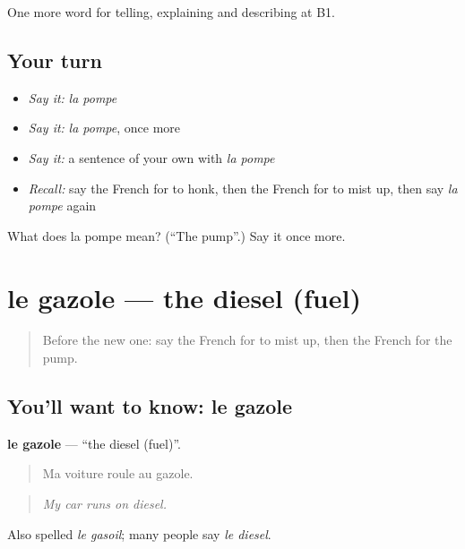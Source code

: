 \begin{grammarlens}[title={What you've built}]
One more word for telling, explaining and describing at B1.
\end{grammarlens}

\subsection*{Your turn}
\begin{itemize}
\raggedright
  \item \emph{Say it:} \emph{la pompe}
  \item \emph{Say it:} \emph{la pompe}, once more
  \item \emph{Say it:} a sentence of your own with \emph{la pompe}
  \item \emph{Recall:} say the French for to honk, then the French for to mist up, then say \emph{la pompe} again
\end{itemize}

\begin{tcolorbox}[breakable,colback=teal!4,colframe=teal!35!black,title={Before you move on}]
What does la pompe mean? (\textquotedblleft{}The pump\textquotedblright{}.) Say it once more.
\end{tcolorbox}
\section[le gazole]{le gazole — the diesel (fuel)}

\label{lesson:FR-C403-gazole}



\begin{quote}
Before the new one: say the French for to mist up, then the French for the pump.
\end{quote}

\subsection*{You'll want to know: le gazole}
\textbf{le gazole} — \textquotedblleft{}the diesel (fuel)\textquotedblright{}.

\begin{quote}
Ma voiture roule au gazole.
\end{quote}

\begin{quote}
\emph{My car runs on diesel.}
\end{quote}

Also spelled \emph{le gasoil}; many people say \emph{le diesel}.

